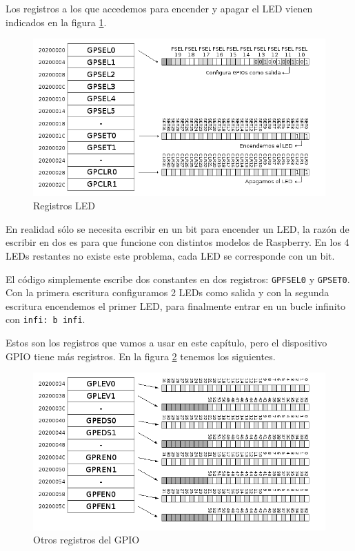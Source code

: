 Los registros a los que accedemos para encender y apagar el LED vienen indicados
en la figura \ref{fig:gpio1}.

\begin{figure}[h]
  \centering
    \includegraphics[width=14cm]{graphs/gpio1.png}
  \caption{Registros LED}
  \label{fig:gpio1}
\end{figure}

En realidad sólo se necesita escribir en un bit para encender un LED, la razón de escribir
en dos es para que funcione con distintos modelos de Raspberry. En los 4 LEDs restantes no
existe este problema, cada LED se corresponde con un bit.

El código simplemente escribe dos constantes en dos registros: {\tt GPFSEL0} y {\tt GPSET0}.
Con la primera escritura configuramos 2 LEDs como salida y con la segunda escritura encendemos
el primer LED, para finalmente entrar en un bucle infinito con {\tt infi: b infi}.

Estos son los registros que vamos a usar en este capítulo, pero el dispositivo GPIO tiene
más registros. En la figura \ref{fig:gpio2} tenemos los siguientes.

\begin{figure}[h]
  \centering
    \includegraphics[width=14cm]{graphs/gpio2.png}
  \caption{Otros registros del GPIO}
  \label{fig:gpio2}
\end{figure}

